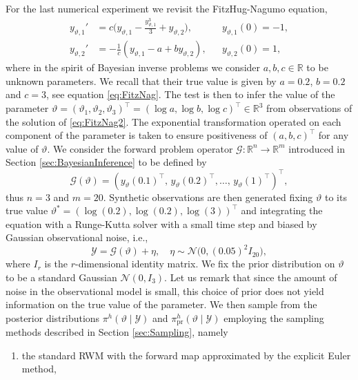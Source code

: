 \documentclass{siamart1116}
\numberwithin{theorem}{section}
\renewcommand{\theta}{\vartheta}
\newcommand{\R}{\mathbb{R}}
\begin{document}
{For the last numerical experiment we revisit the FitzHug-Nagumo equation,
\begin{equation}\label{eq:FitzNag2}
\begin{aligned}
y_{\theta, 1}' &= c\big(y_{\theta, 1} - \frac{y_{\theta, 1}^3}{3} + y_{\theta, 2}\big), && y_{\theta, 1}(0) = -1, \\
y_{\theta, 2}' &= -\frac{1}{c}(y_{\theta, 1} - a + b y_{\theta, 2}), && y_{\theta, 2}(0) = 1,
\end{aligned}
\end{equation}
where in the spirit of Bayesian inverse problems we consider $a, b, c \in \R$ to be unknown parameters. We recall that their true value is given by $a = 0.2$, $b = 0.2$ and $c = 3$, see equation \eqref{eq:FitzNag}. The test is then to infer the value of the parameter $\theta = (\theta_1, \theta_2, \theta_3)^\top = (\log a, \log b, \log c)^\top \in \R^3$ from observations of the solution of \eqref{eq:FitzNag2}. The exponential transformation operated on each component of the parameter is taken to ensure positiveness of $(a, b, c)^\top$ for any value of $\theta$.  We consider the forward problem operator $\mathcal{G} \colon \R^n \to \R^m$ introduced in Section \ref{sec:BayesianInference} to be defined by
\begin{equation}
	\mathcal{G}(\theta) = (y_\theta(0.1)^\top,\, y_\theta(0.2)^\top, \ldots,\, y_\theta(1)^\top)^\top,
\end{equation} 
thus $n = 3$ and $m = 20$. Synthetic observations are then generated fixing $\theta$ to its true value $\theta^* = (\log(0.2), \log(0.2), \log(3))^\top$ and integrating the equation with a Runge-Kutta solver with a small time step and biased by Gaussian observational noise, i.e.,
\begin{equation}
	\mathcal{Y} = \mathcal{G}(\theta) + \eta, \quad \eta \sim \mathcal{N}\big(0, (0.05)^2 I_{20}\big),
\end{equation}
where $I_{r}$ is the $r$-dimensional identity matrix. We fix the prior distribution on $\theta$ to be a standard Gaussian $\mathcal{N}(0, I_3)$. Let us remark that since the amount of noise in the observational model is small, this choice of prior does not yield information on the true value of the parameter. We then sample from the posterior distributions $\pi^h(\theta \mid \mathcal Y)$ and $\pi^h_{\mathrm{pr}}(\theta \mid \mathcal Y)$ employing the sampling methods described in Section \ref{sec:Sampling}, namely
\begin{enumerate}
	 \item the standard RWM with the forward map approximated by the explicit Euler method,

\end{enumerate}}
\end{document}
